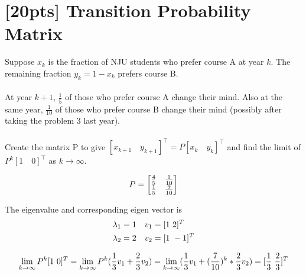 	\section{[20pts] Transition Probability Matrix}
	Suppose $x_k$ is the fraction of NJU students who prefer course A at year $k$. The remaining fraction $y_k = 1-x_k$ prefers course B. \\\\
	At year $k + 1$, $\frac{1}{5}$ of those who prefer course A change their mind. Also at the same year, $\frac{1}{10}$ of those who prefer course B change their mind (possibly after taking the problem 3 last year). \\ \\ 
	Create the matrix P to give $[x_{k+1}\quad y_{k+1}]^\top = P [x_k\quad y_k]^\top$ and find the limit of $P^k[1\quad 0]^\top$ as $k \rightarrow \infty$.

	\begin{solution}
		\begin{equation}
			P=\begin{bmatrix}
				\frac{4}{5} & \frac{1}{10} \\
				\frac{1}{5} & \frac{9}{10} 
			\end{bmatrix} \notag
		\end{equation}
		
		The eigenvalue and corresponding eigen vector is
		\begin{align}
			\lambda_1& =1 & v_1 &=[1\ 2]^T\notag\\
			\lambda_2& =2 & v_2 &=[1\ -1]^T\notag
		\end{align}

		\begin{equation}
			\lim_{k\rightarrow\infty} P^k[1\ 0]^T = \lim_{k\rightarrow\infty} P^k(\frac{1}{3}v_1+\frac{2}{3}v_2) = \lim_{k\rightarrow\infty} (\frac{1}{3}v_1+(\frac{7}{10})^k*\frac{2}{3}v_2) = [\frac{1}{3}\ \frac{2}{3}]^T \notag
		\end{equation}
	\end{solution}
	
